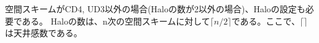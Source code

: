 空間スキームがCD4, UD3以外の場合(Haloの数が2以外の場合)、Haloの設定も必要である。
Haloの数は、n次の空間スキームに対して$\lceil n/2 \rceil$である。ここで、$\lceil \rceil$ は天井感数である。\\

\\
